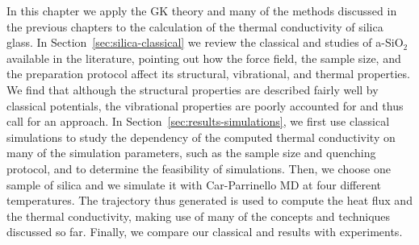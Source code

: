 
In this chapter we apply the \abinitio GK theory and many of the methods discussed in the previous chapters to the calculation of the thermal conductivity of silica glass. 
In Section~\ref{sec:silica-classical} we review the classical and \abinitio studies of a-SiO$_2$ available in the literature, pointing out how the force field, the sample size, and the preparation protocol affect its structural, vibrational, and thermal properties. 
We find that although the structural properties are described fairly well by classical potentials, the vibrational properties are poorly accounted for and thus call for an \abinitio approach. 
In Section~\ref{sec:results-simulations}, we first use classical simulations to study the dependency of the computed thermal conductivity on many of the simulation parameters, such as the sample size and quenching protocol, and to determine the feasibility of \abinitio simulations. 
Then, we choose one sample of silica and we simulate it with Car-Parrinello MD at four different temperatures. The trajectory thus generated is used to compute the \abinitio heat flux and the thermal conductivity, making use of many of the concepts and techniques discussed so far. Finally, we compare our classical and \abinitio results with experiments. 



